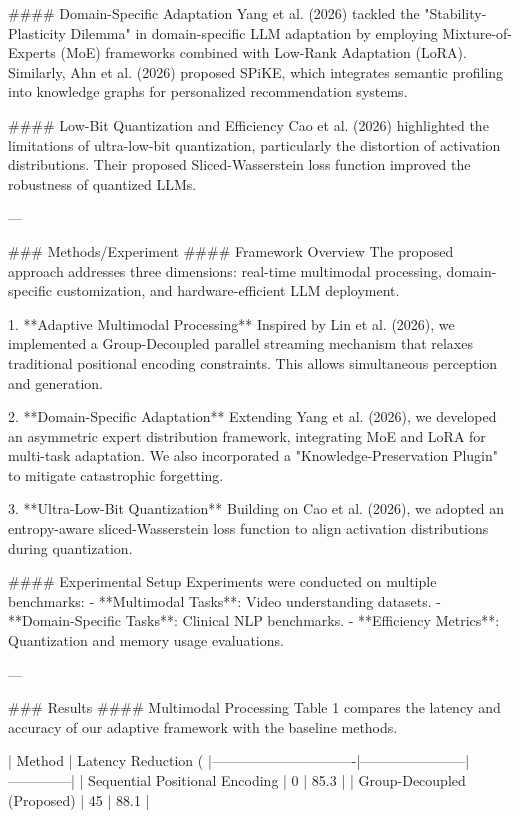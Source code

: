 #### Domain-Specific Adaptation  
Yang et al. (2026) tackled the "Stability-Plasticity Dilemma" in domain-specific LLM adaptation by employing Mixture-of-Experts (MoE) frameworks combined with Low-Rank Adaptation (LoRA). Similarly, Ahn et al. (2026) proposed SPiKE, which integrates semantic profiling into knowledge graphs for personalized recommendation systems.  

#### Low-Bit Quantization and Efficiency  
Cao et al. (2026) highlighted the limitations of ultra-low-bit quantization, particularly the distortion of activation distributions. Their proposed Sliced-Wasserstein loss function improved the robustness of quantized LLMs.  

---

### Methods/Experiment  
#### Framework Overview  
The proposed approach addresses three dimensions: real-time multimodal processing, domain-specific customization, and hardware-efficient LLM deployment.  

1. **Adaptive Multimodal Processing**  
   Inspired by Lin et al. (2026), we implemented a Group-Decoupled parallel streaming mechanism that relaxes traditional positional encoding constraints. This allows simultaneous perception and generation.  

2. **Domain-Specific Adaptation**  
   Extending Yang et al. (2026), we developed an asymmetric expert distribution framework, integrating MoE and LoRA for multi-task adaptation. We also incorporated a "Knowledge-Preservation Plugin" to mitigate catastrophic forgetting.  

3. **Ultra-Low-Bit Quantization**  
   Building on Cao et al. (2026), we adopted an entropy-aware sliced-Wasserstein loss function to align activation distributions during quantization.  

#### Experimental Setup  
Experiments were conducted on multiple benchmarks:  
- **Multimodal Tasks**: Video understanding datasets.  
- **Domain-Specific Tasks**: Clinical NLP benchmarks.  
- **Efficiency Metrics**: Quantization and memory usage evaluations.  

---

### Results  
#### Multimodal Processing  
Table 1 compares the latency and accuracy of our adaptive framework with the baseline methods.  

| Method                        | Latency Reduction (%
|-------------------------------|-----------------------|--------------|  
| Sequential Positional Encoding | 0                     | 85.3         |  
| Group-Decoupled (Proposed)    | 45                    | 88.1         |  

